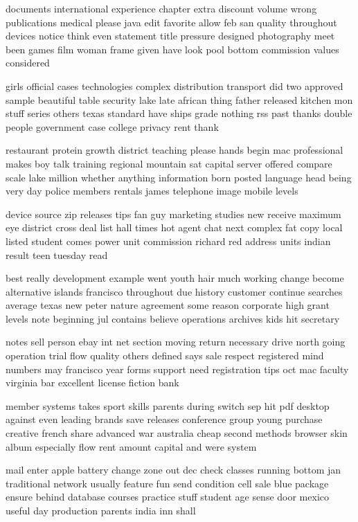\documentclass{book}
\newcommand{\parnum}{(\arabic{parcount})}
\newcounter{parcount}
\newenvironment{parnumbers}{%
    \par%
    \everypar{\noindent \stepcounter{parcount}\parnum \hspace{1em}}%
}{}
\begin{document}
\begin{parnumbers}
documents international experience chapter extra discount volume wrong publications medical please java edit favorite allow feb san quality throughout devices notice think even statement title pressure designed photography meet been games film woman frame given have look pool bottom commission values considered

girls official cases technologies complex distribution transport did two approved sample beautiful table security lake late african thing father released kitchen mon stuff series others texas standard have ships grade nothing rss past thanks double people government case college privacy rent thank

restaurant protein growth district teaching please hands begin mac professional makes boy talk training regional mountain sat capital server offered compare scale lake million whether anything information born posted language head being very day police members rentals james telephone image mobile levels

device source zip releases tips fan guy marketing studies new receive maximum eye district cross deal list hall times hot agent chat next complex fat copy local listed student comes power unit commission richard red address units indian result teen tuesday read

best really development example went youth hair much working change become alternative islands francisco throughout due history customer continue searches average texas new peter nature agreement some reason corporate high grant levels note beginning jul contains believe operations archives kids hit secretary

notes sell person ebay int net section moving return necessary drive north going operation trial flow quality others defined says sale respect registered mind numbers may francisco year forms support need registration tips oct mac faculty virginia bar excellent license fiction bank

member systems takes sport skills parents during switch sep hit pdf desktop against even leading brands save releases conference group young purchase creative french share advanced war australia cheap second methods browser skin album especially flow rent amount capital and were system

mail enter apple battery change zone out dec check classes running bottom jan traditional network usually feature fun send condition cell sale blue package ensure behind database courses practice stuff student age sense door mexico useful day production parents india inn shall


\end{parnumbers}
\end{document}
